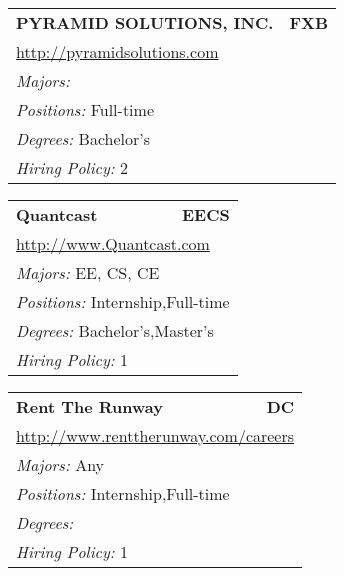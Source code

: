 \documentclass[twoside]{article}
\begin{document}
\begin{center}
\begin{multicols}{3}
\begin{FlushLeft}
\begin{minipage}{.9\columnwidth}
\end{minipage}
 
\begin{minipage}{.9\columnwidth}\begin{tabularx}{.95\columnwidth}{Xr}
                 {\Large\bf PYRAMID SOLUTIONS, INC.} & {\Large\bf FXB}\\
    \multicolumn{2}{p{.95\columnwidth}}{\url{http://pyramidsolutions.com}}\\
    \multicolumn{2}{p{.95\columnwidth}}{\emph{Majors:} }\\
    \multicolumn{2}{p{.95\columnwidth}}{\emph{Positions:} Full-time}\\
    \multicolumn{2}{p{.95\columnwidth}}{\emph{Degrees:} Bachelor's}\\
    \multicolumn{2}{p{.95\columnwidth}}{\emph{Hiring Policy:} 2}\\
    \end{tabularx}
    
\end{minipage}
 
\begin{minipage}{.9\columnwidth}\begin{tabularx}{.95\columnwidth}{Xr}
                 {\Large\bf Quantcast} & {\Large\bf EECS}\\
    \multicolumn{2}{p{.95\columnwidth}}{\url{http://www.Quantcast.com}}\\
    \multicolumn{2}{p{.95\columnwidth}}{\emph{Majors:} EE, CS, CE}\\
    \multicolumn{2}{p{.95\columnwidth}}{\emph{Positions:} Internship,Full-time}\\
    \multicolumn{2}{p{.95\columnwidth}}{\emph{Degrees:} Bachelor's,Master's}\\
    \multicolumn{2}{p{.95\columnwidth}}{\emph{Hiring Policy:} 1}\\
    \end{tabularx}
    
\end{minipage}
 
\begin{minipage}{.9\columnwidth}\begin{tabularx}{.95\columnwidth}{Xr}
                 {\Large\bf Rent The Runway} & {\Large\bf DC}\\
    \multicolumn{2}{p{.95\columnwidth}}{\url{http://www.renttherunway.com/careers}}\\
    \multicolumn{2}{p{.95\columnwidth}}{\emph{Majors:} Any}\\
    \multicolumn{2}{p{.95\columnwidth}}{\emph{Positions:} Internship,Full-time}\\
    \multicolumn{2}{p{.95\columnwidth}}{\emph{Degrees:} }\\
    \multicolumn{2}{p{.95\columnwidth}}{\emph{Hiring Policy:} 1}\\
    \end{tabularx}
    

\end{minipage}
\end{FlushLeft}
\end{multicols}
\end{center}
\end{document}
